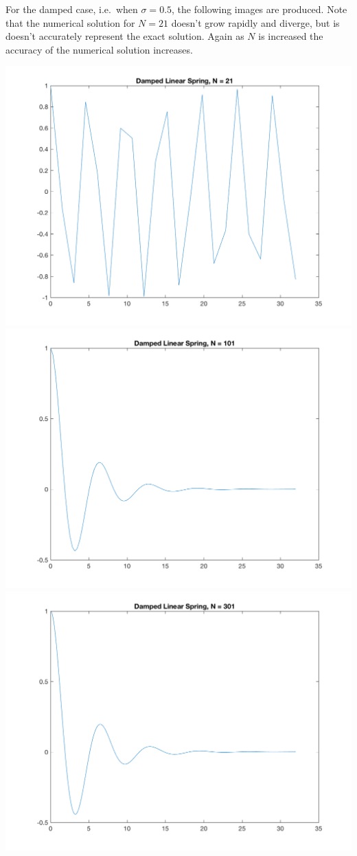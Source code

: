 \documentclass[11pt, oneside]{article}
\begin{document}
\begin{enumerate}
      For the damped case, i.e.\ when $\sigma = 0.5$, the following images are
      produced.
      Note that the numerical solution for $N = 21$ doesn't grow rapidly
      and diverge, but is doesn't accurately represent the exact solution.
      Again as $N$ is increased the accuracy of the numerical solution increases.
      \begin{center}
        \includegraphics[scale=.6]{Figures/01_06.png}
        \includegraphics[scale=.6]{Figures/01_07.png}
        \includegraphics[scale=.6]{Figures/01_08.png}

\end{center}
\end{enumerate}
\end{document}
